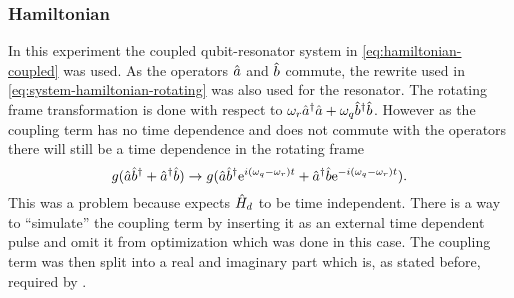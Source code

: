 \documentclass[main.tex]{subfiles}
\begin{document}
\subsubsection{Hamiltonian}
In this experiment the coupled qubit-resonator system in \cref{eq:hamiltonian-coupled} was used.
As the operators \(\hat{a}\) and \(\hat{b}\) commute, the rewrite used in \cref{eq:system-hamiltonian-rotating} was also used for the resonator.
The rotating frame transformation is done with respect to \(\omega_{r} \hat{a}^\dagger\hat{a} + \omega_{q} \hat{b}^\dagger\hat{b} \).
However as the coupling term has no time dependence and does not commute with the operators there will still be a time dependence in the rotating frame
\begin{equation}
    g(\hat{a}\hat{b}^\dagger + \hat{a}^\dagger\hat{b}) \rightarrow g(\hat{a}\hat{b}^\dagger\mathrm{e}^{i(\omega_q-\omega_r)t} + \hat{a}^\dagger\hat{b}\mathrm{e}^{-i(\omega_q-\omega_r)t}).
\end{equation}
This was a problem because \krotov{} expects \(\hat{H}_d\) to be time independent.
There is a way to ``simulate'' the coupling term by inserting it as an external time dependent pulse and omit it from optimization which was done in this case.
The coupling term was then split into a real and imaginary part which is, as stated before, required by \krotov{}.
\end{document}
